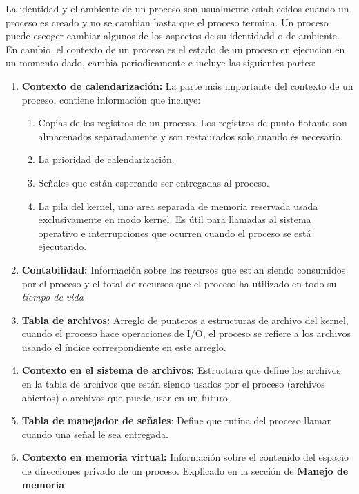 \documentclass[spanish]{article}
\begin{document}
La identidad y el ambiente de un proceso son usualmente establecidos cuando un proceso es creado y no se cambian hasta que el proceso termina. Un proceso puede escoger cambiar algunos de los aspectos de su identidadd o de ambiente. En cambio, el contexto de un proceso es el estado de un proceso en ejecucion en un momento dado, cambia periodicamente e incluye las siguientes partes:
\begin{enumerate}
\item \textbf{Contexto de calendarizaci\'{o}n: } La parte m\'{a}s importante del contexto de un proceso, contiene informaci\'{o}n que incluye:
  \begin{enumerate}
  \item Copias de los registros de un proceso. Los registros de punto-flotante son almacenados separadamente y son restaurados solo cuando es necesario.
    \item La prioridad de calendarizaci\'{o}n.
    \item Se\~{n}ales que est\'{a}n esperando ser entregadas al proceso.
    \item La pila del kernel, una area separada de memoria reservada usada exclusivamente en modo kernel. Es \'{u}til para llamadas al sistema operativo e interrupciones que ocurren cuando el proceso se est\'{a} ejecutando.
  \end{enumerate}
\item \textbf{Contabilidad: } Informaci\'{o}n sobre los recursos que est'{a}n siendo consumidos por el proceso y el total de recursos que el proceso ha utilizado en todo su \textit{tiempo de vida}
\item \textbf{Tabla de archivos: } Arreglo de punteros a estructuras de archivo del kernel, cuando el proceso hace operaciones de I/O, el proceso se refiere a los archivos usando el \'{i}ndice correspondiente en este arreglo.
\item \textbf{Contexto en el sistema de archivos: } Estructura que define los archivos en la tabla de archivos que est\'{a}n siendo usados por el proceso (archivos abiertos) o archivos que puede usar en un futuro.
\item \textbf{Tabla de manejador de se\~{n}ales}: Define que rutina del proceso llamar cuando una se\~{n}al le sea entregada.
\item \textbf{Contexto en memoria virtual: } Informaci\'{o}n sobre el contenido del espacio de direcciones privado de un proceso. Explicado en la secci\'{o}n de \textbf{Manejo de memoria}
\end{enumerate}
\end{document}
